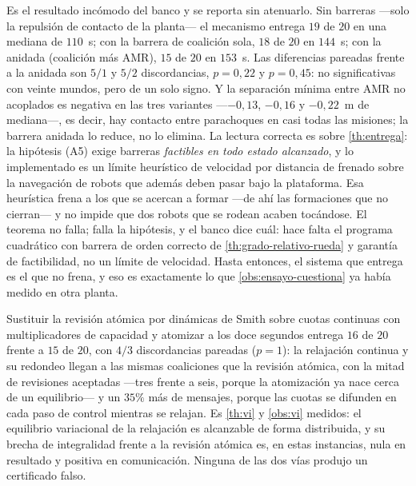 \begin{observacion}
\label{obs:ensayo-cierre-seguridad}
Es el resultado incómodo del banco y se reporta sin atenuarlo. Sin barreras
—solo la repulsión de contacto de la planta— el mecanismo entrega $19$ de
$20$ en una mediana de $110$~s; con la barrera de coalición sola, $18$ de $20$
en $144$~s; con la anidada (coalición más AMR), $15$ de $20$ en $153$~s. Las
diferencias pareadas frente a la anidada son $5/1$ y $5/2$ discordancias,
$p=0{,}22$ y $p=0{,}45$: no significativas con veinte mundos, pero de un solo
signo. Y la separación mínima entre AMR no acoplados es negativa en las tres
variantes —$-0{,}13$, $-0{,}16$ y $-0{,}22$~m de mediana—, es decir, hay
contacto entre parachoques en casi todas las misiones; la barrera anidada lo
reduce, no lo elimina. La lectura correcta es sobre \cref{th:entrega}: la
hipótesis (A5) exige barreras \emph{factibles en todo estado alcanzado}, y lo
implementado es un límite heurístico de velocidad por distancia de frenado
sobre la navegación de robots que además deben pasar bajo la plataforma. Esa
heurística frena a los que se acercan a formar —de ahí las formaciones que no
cierran— y no impide que dos robots que se rodean acaben tocándose. El
teorema no falla; falla la hipótesis, y el banco dice cuál: hace falta el
programa cuadrático con barrera de orden correcto de
\cref{th:grado-relativo-rueda} y garantía de factibilidad, no un límite de
velocidad. Hasta entonces, el sistema que entrega es el que no frena, y eso
es exactamente lo que \cref{obs:ensayo-cuestiona} ya había medido en otra
planta.
\end{observacion}

\begin{observacion}
\label{obs:ensayo-cierre-gne}
Sustituir la revisión atómica por dinámicas de Smith sobre cuotas continuas
con multiplicadores de capacidad y atomizar a los doce segundos entrega $16$
de $20$ frente a $15$ de $20$, con $4/3$ discordancias pareadas ($p=1$): la
relajación continua y su redondeo llegan a las mismas coaliciones que la
revisión atómica, con la mitad de revisiones aceptadas —tres frente a seis,
porque la atomización ya nace cerca de un equilibrio— y un $35\%$ más de
mensajes, porque las cuotas se difunden en cada paso de control mientras se
relajan. Es \cref{th:vi} y \cref{obs:vi} medidos: el equilibrio variacional
de la relajación es alcanzable de forma distribuida, y su brecha de
integralidad frente a la revisión atómica es, en estas instancias, nula en
resultado y positiva en comunicación. Ninguna de las dos vías produjo un
certificado falso.
\end{observacion}

